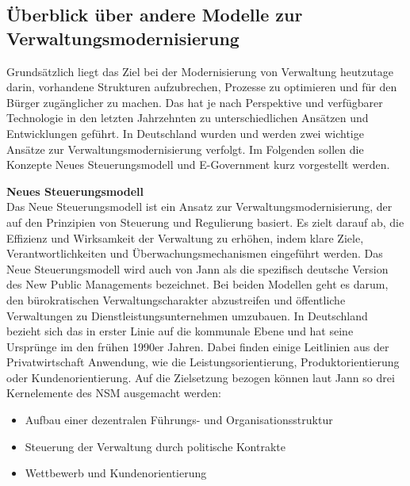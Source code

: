 \subsection{Überblick über andere Modelle zur Verwaltungsmodernisierung}
Grundsätzlich liegt das Ziel bei der Modernisierung von Verwaltung heutzutage darin, vorhandene Strukturen aufzubrechen, Prozesse zu optimieren und für den Bürger zugänglicher zu machen.
Das hat je nach Perspektive und verfügbarer Technologie in den letzten Jahrzehnten zu unterschiedlichen Ansätzen und Entwicklungen geführt.
In Deutschland wurden und werden zwei wichtige Ansätze zur Verwaltungsmodernisierung verfolgt.
Im Folgenden sollen die Konzepte \glqq{}Neues Steuerungsmodell\grqq{} und \glqq{}E-Government\grqq{} kurz vorgestellt werden.

\textbf{Neues Steuerungsmodell}\\%
Das Neue Steuerungsmodell ist ein Ansatz zur Verwaltungsmodernisierung, der auf den Prinzipien von Steuerung und Regulierung basiert. 
Es zielt darauf ab, die Effizienz und Wirksamkeit der Verwaltung zu erhöhen, indem klare Ziele, Verantwortlichkeiten und Überwachungsmechanismen eingeführt werden.
Das Neue Steuerungsmodell wird auch von Jann als die \glqq{}spezifisch deutsche Version\grqq{} \citep[vgl.][S. 127]{Jann2019} des \glqq{}New Public Managements\grqq{} bezeichnet.
Bei beiden Modellen geht es darum, den bürokratischen Verwaltungscharakter abzustreifen und öffentliche Verwaltungen zu Dienstleistungsunternehmen umzubauen.
In Deutschland bezieht sich das in erster Linie auf die kommunale Ebene und hat seine Ursprünge im den frühen 1990er Jahren.
Dabei finden einige Leitlinien aus der Privatwirtschaft Anwendung, wie die Leistungsorientierung, Produktorientierung oder Kundenorientierung.
Auf die Zielsetzung bezogen können laut Jann so drei Kernelemente des NSM \citep[vgl.][S. 127]{Jann2019} ausgemacht werden:

\begin{itemize}
  \item Aufbau einer dezentralen Führungs- und Organisationsstruktur
  \item Steuerung der Verwaltung durch politische Kontrakte
  \item Wettbewerb und Kundenorientierung
\end{itemize}

